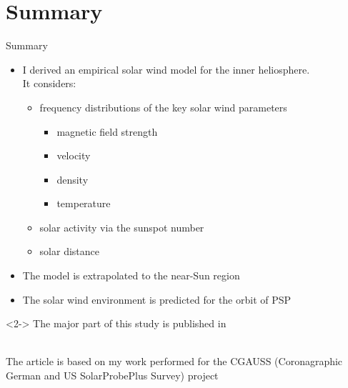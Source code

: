\section{Summary}

\begin{frame}[c]{Summary}{}
	
	\begin{itemize}%
		\item I derived an empirical solar wind model for the inner heliosphere.\\
			It considers:
		\begin{itemize}
			\item frequency distributions of the key solar wind parameters
			\begin{itemize}
				\item magnetic field strength
				\item velocity
				\item density
				\item temperature
			\end{itemize}
			\item solar activity via the sunspot number
			\item solar distance
		\end{itemize}
		\item The model is extrapolated to the near-Sun region
		\item The solar wind environment is predicted for the orbit of PSP
	\end{itemize}
	\vspace{2mm}
	\begin{block}<2->{}
		\footnotesize
		The major part of this study is published in \citet{Venzmer2018}\\\ 
		
		The article is based on my work performed for the CGAUSS (Coronagraphic German and US SolarProbePlus Survey) project
	\end{block}

	
\end{frame}

